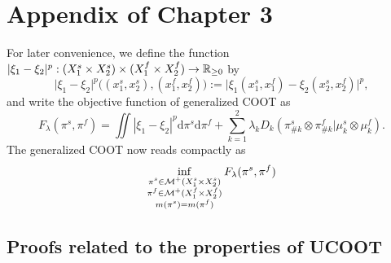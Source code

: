 \section{Appendix of Chapter 3}

For later convenience, we define the function
$\vert \xi_1 - \xi_2 \vert^p: (X_1^s \times X_2^s) \times (X_1^f \times X_2^f) \to \mathbb R_{\geq 0}$ by
\begin{equation}
    \vert \xi_1 - \xi_2 \vert^p \big((x_1^s, x_2^s), (x_1^f, x_2^f)\big) :=
    \vert \xi_1(x_1^s, x_1^f) - \xi_2(x_2^s, x_2^f) \vert^p,
\end{equation}
and write the objective function of generalized COOT as
\begin{equation}
    F_{\lambda}(\pi^s, \pi^f) = \iint |\xi_1 - \xi_2|^p \mathrm d\pi^s \mathrm d \pi^f
    + \sum_{k=1}^2\lambda_k D_k(\pi^s_{\#k} \otimes \pi^f_{\#k} \vert \mu^s_k \otimes \mu^f_k).
\end{equation}
The generalized COOT now reads compactly as
\begin{equation} \label{eq:ucoot_copy}
  \inf_{\substack{\pi^s \in \mathcal M^+(X_1^s \times X_2^s) \\
  \pi^f \in \mathcal M^+(X_1^f \times X_2^f) \\ m(\pi^s) = m(\pi^f)}} F_{\lambda}(\pi^s, \pi^f)
\end{equation}

\subsection{Proofs related to the properties of UCOOT}

